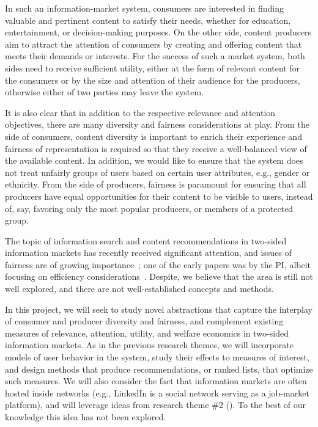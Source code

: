 \documentclass[a4paper,11pt]{article}
\begin{document}
In such an information-market system, 
consumers are interested in finding valuable and pertinent content to satisfy their needs, 
whether for education, entertainment, or decision-making purposes. 
On the other side, content producers aim to attract the attention of consumers 
by creating and offering content that meets their demands or interests.
For the success of such a market system, both sides need to receive sufficient utility, 
either at the form of relevant content for the consumers 
or by the size and attention of their audience for the producers, 
otherwise either of two parties may leave the system. 

It is also clear that in addition to the respective relevance and attention objectives, 
there are many diversity and fairness considerations at play. 
From the side of consumers, 
content diversity is important to enrich their experience and
fairness of representation is required so that they receive a well-balanced
view of the available content.
In addition, we would like to ensure that the system does not treat unfairly 
groups of users based on certain user attributes, e.g., gender or ethnicity. 
From the side of producers, 
fairness is paramount for ensuring that all producers have equal opportunities
for their content to be visible to users, 
instead of, say, favoring only the most popular producers, 
or members of a protected group. 

The topic of information search and content recommendations in two-sided information markets 
has recently received significant attention, 
and issues of fairness are of growing importance~\cite{do2021two,wang2021user};
one of the early papers was by the PI, 
albeit focusing on efficiency considerations~\cite{gdfm2011social}.
Despite, we believe that the area is still not well explored, 
and there are not well-established concepts and methods. 

In this project, we will seek to study novel abstractions
that capture the interplay of consumer and producer diversity and fairness, 
and complement existing measures of relevance, attention, utility, 
and welfare economics in two-sided information markets.
As in the previous research themes, 
we will incorporate models of user behavior in the system, 
study their effects to measures of interest, 
and design methods that produce recommendations, or ranked lists, 
that optimize such measures. 
We will also consider the fact that information markets are often hosted inside networks
(e.g., LinkedIn is a social network serving as a job-market platform), 
and will leverage ideas from research theme \#2 (\networks).
To the best of our knowledge this idea has not been explored.
\end{document}
